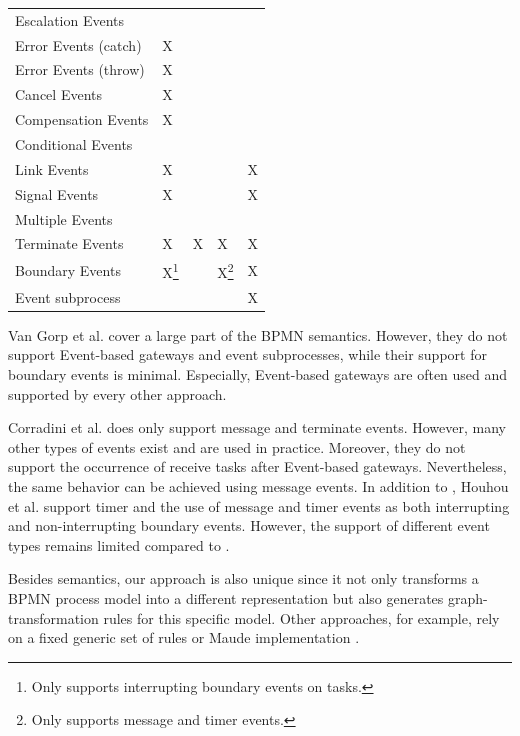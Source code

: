 \documentclass[adraft, copyright, creativecommons]{eptcs} %
\begin{document}
\begin{table}[htbp]
\begin{tabular}{l l l l l}
      Escalation Events & & & & \\
      Error Events (catch) & X & & &\\
      Error Events (throw) & X & & &\\
      Cancel Events & X & & &\\
      Compensation Events & X & & &\\
      Conditional Events & & & &\\
      Link Events & X & & & X\\
      Signal Events & X & & & X\\
      Multiple Events &  & & & \\
      Terminate Events & X & X & X & X\\
     Boundary Events & X\footnote{Only supports interrupting boundary events on tasks.} & & X\footnote{Only supports message and timer events.} & X\\ %
      Event subprocess &  &  &  & X\\
    \end{tabular}
\end{table}

Van Gorp et al. \cite{vangorpVisualTokenbasedFormalization2013} cover a large part of the BPMN semantics.
However, they do not support Event-based gateways and event subprocesses, while their support for boundary events is minimal.
Especially, Event-based gateways are often used and supported by every other approach.

Corradini et al. \cite{corradiniFormalApproachAnalysis2021} does only support message and terminate events.
However, many other types of events exist and are used in practice.
Moreover, they do not support the occurrence of receive tasks after Event-based gateways.
Nevertheless, the same behavior can be achieved using message events.
In addition to \cite{corradiniFormalApproachAnalysis2021}, Houhou et al. \cite{houhouFirstOrderLogicVerification2022} support timer and the use of message and timer events as both interrupting and non-interrupting boundary events.
However, the support of different event types remains limited compared to \cite{vangorpVisualTokenbasedFormalization2013}.

Besides semantics, our approach is also unique since it not only transforms a BPMN process model into a different representation but also generates graph-transformation rules for this specific model.
Other approaches, for example, rely on a fixed generic set of rules \cite{vangorpVisualTokenbasedFormalization2013} or Maude implementation \cite{corradiniFormalApproachAnalysis2021}.
\end{document}
